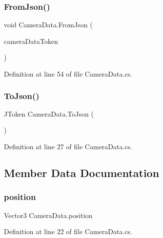 \subsubsection{\texorpdfstring{From\+Json()}{FromJson()}}
{\footnotesize\ttfamily void Camera\+Data.\+From\+Json (\begin{DoxyParamCaption}\item[{J\+Token}]{camera\+Data\+Token }\end{DoxyParamCaption})}



Definition at line 54 of file Camera\+Data.\+cs.

\mbox{\label{class_camera_data_a8d13351ec9d2955cd702be0f77b1be50}} 
\subsubsection{\texorpdfstring{To\+Json()}{ToJson()}}
{\footnotesize\ttfamily J\+Token Camera\+Data.\+To\+Json (\begin{DoxyParamCaption}{ }\end{DoxyParamCaption})}



Definition at line 27 of file Camera\+Data.\+cs.



\subsection{Member Data Documentation}
\mbox{\label{class_camera_data_ad52c2b17d55ce14f104d710b4816d807}} 
\subsubsection{\texorpdfstring{position}{position}}
{\footnotesize\ttfamily Vector3 Camera\+Data.\+position}



Definition at line 22 of file Camera\+Data.\+cs.

\mbox{\label{class_camera_data_ade368787d30a145ccb9bcf3fd64c5bfb}} 
